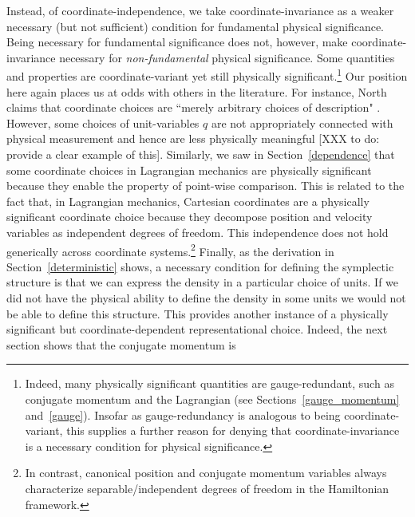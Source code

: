 \documentclass[letterpaper]{article}
\begin{document}
Instead, of coordinate-independence, we take coordinate-invariance as a weaker necessary (but not sufficient) condition for fundamental physical significance. Being necessary for fundamental significance does not, however, make coordinate-invariance necessary for \textit{non-fundamental} physical significance. Some quantities and properties are coordinate-variant yet still physically significant.\footnote{Indeed, many physically significant quantities are gauge-redundant, such as conjugate momentum and the Lagrangian (see Sections~\ref{gauge_momentum} and~\ref{gauge}). Insofar as gauge-redundancy is analogous to being coordinate-variant, this supplies a further reason for denying that coordinate-invariance is a necessary condition for physical significance.} Our position here again places us at odds with others in the literature. For instance, North claims that coordinate choices are ``merely arbitrary choices of description" \parencites*[61]{North}. However, some choices of unit-variables $q$ are not appropriately connected with physical measurement and hence are less physically meaningful [XXX to do: provide a clear example of this]. Similarly, we saw in Section~\ref{dependence} that some coordinate choices in Lagrangian mechanics are physically significant because they enable the property of point-wise comparison. This is related to the fact that, in Lagrangian mechanics, Cartesian coordinates are a physically significant coordinate choice because they decompose position and velocity variables as independent degrees of freedom. This independence does not hold generically across coordinate systems.\footnote{In contrast, canonical position and conjugate momentum variables always characterize separable/independent degrees of freedom in the Hamiltonian framework.} Finally, as the derivation in Section~\ref{deterministic} shows, a necessary condition for defining the symplectic structure is that we can express the density in a particular choice of units. If we did not have the physical ability to define the density in some units we would not be able to define this structure. This provides another instance of a physically significant but coordinate-dependent representational choice. Indeed, the next section shows that the conjugate momentum is


\end{document}
